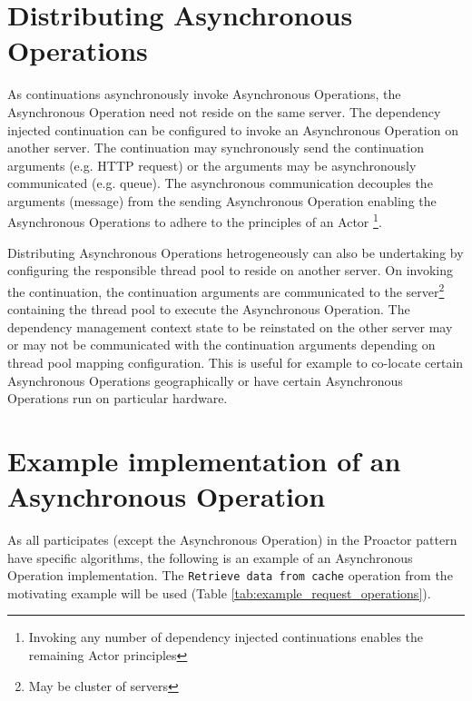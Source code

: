 \documentclass{article}
\begin{document}
\section{Distributing Asynchronous Operations}

As continuations asynchronously invoke Asynchronous Operations, the Asynchronous
Operation need not reside on the same server.  The dependency injected
continuation can be configured to invoke an Asynchronous Operation on another
server.  The continuation may synchronously send the continuation arguments
(e.g. HTTP request) or the arguments may be asynchronously communicated (e.g.
queue).  The asynchronous communication decouples the arguments (message) from
the sending Asynchronous Operation enabling the Asynchronous Operations to
adhere to the principles of an Actor \cite{actors}\footnote{Invoking any number
of dependency injected continuations enables the remaining Actor principles}.

Distributing Asynchronous Operations hetrogeneously can also be undertaking by
configuring the responsible thread pool to reside on another server.  On
invoking the continuation, the continuation arguments are communicated to the
server\footnote{May be cluster of servers} containing the thread pool to execute
the Asynchronous Operation.  The dependency management context state to be
reinstated on the other server may or may not be communicated with the
continuation arguments depending on thread pool mapping configuration.  This is
useful for example to co-locate certain Asynchronous Operations geographically
or have certain Asynchronous Operations run on particular hardware.


\section{Example implementation of an Asynchronous Operation}

As all participates (except the Asynchronous Operation) in the Proactor pattern
have specific algorithms, the following is an example of an Asynchronous
Operation implementation.  The \texttt{Retrieve data from cache} operation from
the motivating example will be used (Table
\ref{tab:example_request_operations}).
\end{document}
